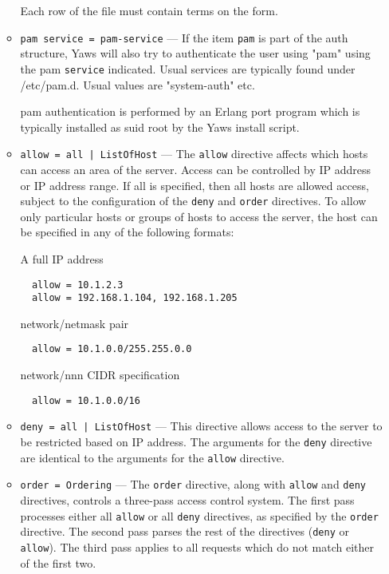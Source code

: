 \documentclass[11pt,oneside,english]{book}
\begin{document}
\begin{itemize}
\begin{itemize}
                Each row of the file must contain terms on the form.

              \item \verb+pam service = pam-service+ --- If the item \verb+pam+
                is part of the auth structure, Yaws will also try to
                authenticate the user using "pam" using the pam \verb+service+
                indicated. Usual services are typically found under
                /etc/pam.d. Usual values are "system-auth" etc.

                pam authentication is performed by an Erlang port program which
                is typically installed as suid root by the Yaws install script.

              \item \verb+allow = all | ListOfHost+ --- The \verb+allow+
                directive affects which hosts can access an area of the
                server. Access can be controlled by IP address or IP address
                range. If all is specified, then all hosts are allowed access,
                subject to the configuration of the \verb+deny+ and \verb+order+
                directives. To allow only particular hosts or groups of hosts to
                access the server, the host can be specified in any of the
                following formats:

                A full IP address
\begin{verbatim}
  allow = 10.1.2.3
  allow = 192.168.1.104, 192.168.1.205
\end{verbatim}
                network/netmask pair
\begin{verbatim}
  allow = 10.1.0.0/255.255.0.0
\end{verbatim}
                network/nnn CIDR specification
\begin{verbatim}
  allow = 10.1.0.0/16
\end{verbatim}

              \item \verb+deny = all | ListOfHost+ --- This directive allows
                access to the server to be restricted based on IP address. The
                arguments for the \verb+deny+ directive are identical to the
                arguments for the \verb+allow+ directive.

              \item \verb+order = Ordering+ --- The \verb+order+ directive,
                along with \verb+allow+ and \verb+deny+ directives, controls a
                three-pass access control system. The first pass processes
                either all \verb+allow+ or all \verb+deny+ directives, as
                specified by the \verb+order+ directive. The second pass parses
                the rest of the directives (\verb+deny+ or \verb+allow+). The
                third pass applies to all requests which do not match either of
                the first two.


\end{itemize}
\end{itemize}
\end{document}
